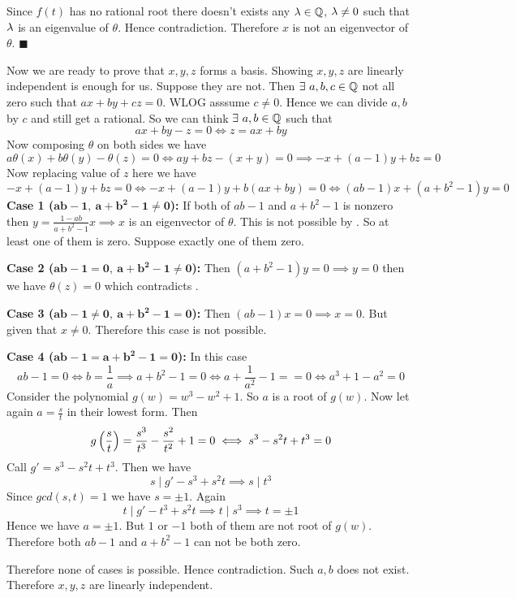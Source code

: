 \documentclass[a4paper, 11pt]{article}
\renewenvironment{proof}{\noindent{\it \textbf{Proof:}}\hspace*{1em}}{\hfill $\blacksquare$\bigskip\\}
\begin{document}
{\begin{proof}
	Since $f(t)$ has no rational root there doesn't exists any $\lambda\in\mathbb{Q}$, $\lambda\neq 0$ such that $\lambda$ is an eigenvalue of $\theta$. Hence contradiction. Therefore $x$ is not an eigenvector of $\theta$. 
\end{proof}

Now we are ready to prove that $x,y,z$ forms a basis. Showing $x,y,z$ are linearly independent is enough for us. Suppose they are not. Then $\exists\ a,b,c\in \mathbb{Q}$  not all zero such that $ax+by+cz=0$. WLOG asssume $c\neq 0$. Hence we can divide $a,b$ by $c$ and still get a rational. So we can think $\exists\ a,b\in \mathbb{Q}$ such that $$ax+by-z=0\iff z=ax+by$$ Now composing $\theta$ on both sides we have \begin{equation*}
	a\theta(x)+b\theta(y)-\theta(z)=0\iff ay+bz-(x+y)=0\implies {-x+(a-1)y+bz=0}\label{compose1}
\end{equation*}Now replacing value of $z$ here we have $$-x+(a-1)y+bz=0\iff -x+(a-1)y+b({ax+by})=0\iff (ab-1)x+(a+b^2-1)y=0$$\textbf{Case 1 ($\boldsymbol{ab-1,\ a+b^2-1\neq 0}$):} If both of $ab-1$ and $a+b^2-1$ is nonzero then $y=\frac{1-ab}{a+b^2-1}x\implies x$ is an eigenvector of $\theta$. This is not possible by .  So at least one of them is zero. Suppose exactly one of them zero.\vspace*{2mm} \parinf

\textbf{Case 2 ($\boldsymbol{ab-1=0,\ a+b^2-1\neq 0}$):} Then $(a+b^2-1)y=0\implies y=0$ then we have $ \theta(z)=0$ which contradicts .\vspace*{2mm}

\textbf{Case 3 ($\boldsymbol{ab-1\neq0,\ a+b^2-1= 0}$):} Then $(ab-1)x=0\implies x=0$. But given that $x\neq0$. Therefore this case is not possible.\vspace*{2mm}

\textbf{Case 4 ($\boldsymbol{ab-1=a+b^2-1=0}$):} In this case$$ab-1=0\iff b=\frac1a\implies a+b^2-1=0\iff a+\frac1{a^2}-1==0\iff a^3+1-a^2=0$$Consider the polynomial $g(w)=w^3-w^2+1$. So $a$ is a root of $g(w)$. Now let again $a=\frac{s}{t}$ in their lowest form. Then $$g\left(\frac{s}{t}\right)=\frac{s^3}{t^3}-\frac{s^2}{t^2}+1=0\iff s^3-s^2t+t^3=0$$Call $g'= s^3-s^2t+t^3$. Then we have $$s\mid g'-s^3+s^2t\implies s\mid t^3$$Since $gcd(s,t)=1$ we have $s=\pm1$. Again $$t\mid g'-t^3+s^2t\implies t\mid s^3\implies t=\pm1$$Hence we have $a=\pm 1$. But $1$ or $-1$ both of them are  not  root of $g(w)$. Therefore both $ab-1$ and $a+b^2-1$ can not be both zero. \parinn\vspace*{5mm}

Therefore none of cases is possible. Hence contradiction. Such $a,b$ does not exist. Therefore $x,y,z$ are linearly independent. 
}
\pagebreak
\end{document}
